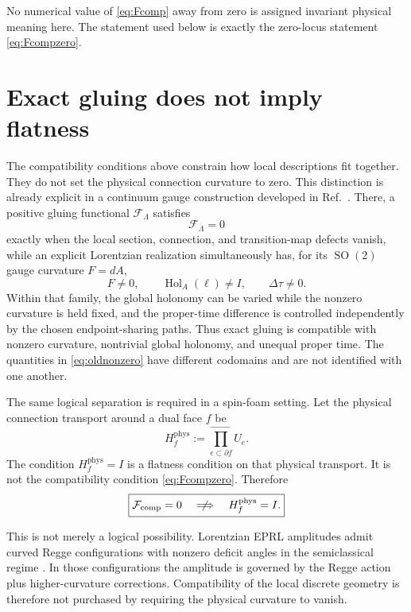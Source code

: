 \documentclass[aps,prd,reprint,nofootinbib,superscriptaddress]{revtex4-2}
\newcommand{\SO}{\operatorname{SO}}
\newcommand{\phys}{\mathrm{phys}}
\begin{document}
No numerical value of \eqref{eq:Fcomp} away from zero is assigned invariant physical meaning here. The statement used below is exactly the zero-locus statement \eqref{eq:Fcompzero}.

\section{Exact gluing does not imply flatness}
\label{sec:glueflat}

The compatibility conditions above constrain how local descriptions fit together. They do not set the physical connection curvature to zero. This distinction is already explicit in a continuum gauge construction developed in Ref.~\cite{CoppaMotionDifference2026}. There, a positive gluing functional $\mathcal F_\Lambda$ satisfies
\begin{equation}
\mathcal F_\Lambda=0
\label{eq:oldglue}
\end{equation}
exactly when the local section, connection, and transition-map defects vanish, while an explicit Lorentzian realization simultaneously has, for its $\SO(2)$ gauge curvature $F=dA$,
\begin{equation}
F\neq0,
\qquad
\operatorname{Hol}_A(\ell)\neq I,
\qquad
\Delta\tau\neq0.
\label{eq:oldnonzero}
\end{equation}
Within that family, the global holonomy can be varied while the nonzero curvature is held fixed, and the proper-time difference is controlled independently by the chosen endpoint-sharing paths. Thus exact gluing is compatible with nonzero curvature, nontrivial global holonomy, and unequal proper time. The quantities in \eqref{eq:oldnonzero} have different codomains and are not identified with one another.

The same logical separation is required in a spin-foam setting. Let the physical connection transport around a dual face $f$ be
\begin{equation}
H_f^{\phys}
:=
\overrightarrow{\prod_{e\subset\partial f}}U_e.
\label{eq:Hphysface}
\end{equation}
The condition $H_f^{\phys}=I$ is a flatness condition on that physical transport. It is not the compatibility condition \eqref{eq:Fcompzero}. Therefore
\begin{equation}
\boxed{
\mathcal F_{\mathrm{comp}}=0
\quad\centernot\Longrightarrow\quad
H_f^{\phys}=I.
}
\label{eq:notflat}
\end{equation}

This is not merely a logical possibility. Lorentzian EPRL amplitudes admit curved Regge configurations with nonzero deficit angles in the semiclassical regime \cite{HanEtAl2022}. In those configurations the amplitude is governed by the Regge action plus higher-curvature corrections. Compatibility of the local discrete geometry is therefore not purchased by requiring the physical curvature to vanish.
\end{document}
